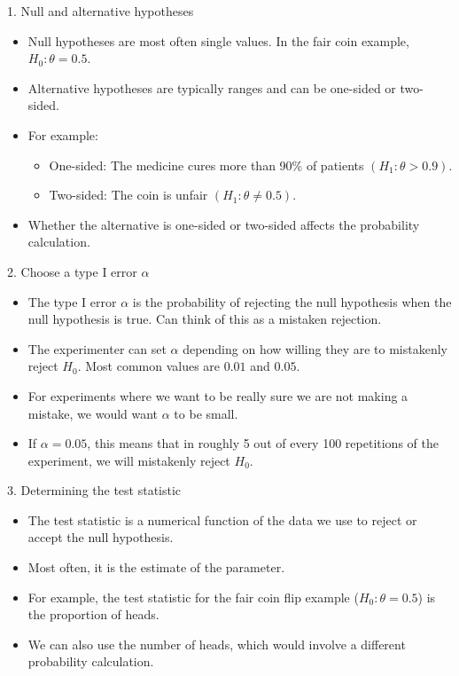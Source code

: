 \documentclass[10pt, xcolor=table]{beamer}
\newcommand*\themecol{\usebeamercolor[fg]{structure}}
\begin{document}
\begin{frame}{1. Null and alternative hypotheses}

\begin{itemize}\itemsep3ex
\item Null hypotheses are most often single values. In the fair coin example, $H_0: \theta = 0.5$.
\item Alternative hypotheses are typically ranges and can be {\themecol one-sided} or {\themecol two-sided}.
\item For example:
\begin{itemize}
\item One-sided: The medicine cures more than 90\% of patients $(H_1: \theta > 0.9)$.
\item Two-sided: The coin is unfair $(H_1: \theta \neq 0.5)$.
\end{itemize}
\item Whether the alternative is one-sided or two-sided affects the probability calculation.
\end{itemize}

\end{frame}

\begin{frame}{2. Choose a type I error $\alpha$}

\begin{itemize}\itemsep3ex
\item The type I error $\alpha$ is the probability of rejecting the null hypothesis when the null hypothesis is true. Can think of this as a mistaken rejection.
\item The experimenter can set $\alpha$ depending on how willing they are to mistakenly reject $H_0$. Most common values are $0.01$ and $0.05$.
\item For experiments where we want to be really sure we are not making a mistake, we would want $\alpha$ to be small.
\item If $\alpha = 0.05$, this means that in roughly 5 out of every 100 repetitions of the experiment, we will mistakenly reject $H_0$.
\end{itemize}

\end{frame}

\begin{frame}{3. Determining the test statistic}

\begin{itemize}\itemsep4ex
\item The test statistic is a numerical function of the data we use to reject or accept the null hypothesis.
\item Most often, it is the estimate of the parameter.
\item For example, the test statistic for the fair coin flip example ($H_0: \theta = 0.5$) is the proportion of heads.
\item We can also use the number of heads, which would involve a different probability calculation.
\end{itemize}

\end{frame}
\end{document}
